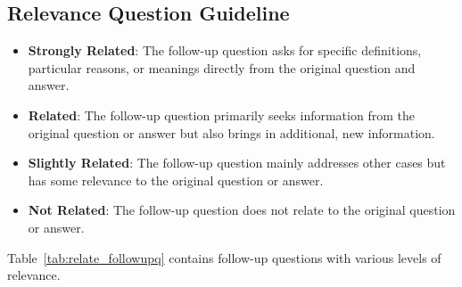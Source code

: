 \subsection{Relevance Question Guideline}

\begin{itemize}
    \item \textbf{Strongly Related}: The follow-up question asks for specific definitions, particular reasons, or meanings directly from the original question and answer.
    \item \textbf{Related}: The follow-up question primarily seeks information from the original question or answer but also brings in additional, new information.
    \item \textbf{Slightly Related}: The follow-up question mainly addresses other cases but has some relevance to the original question or answer.
    \item \textbf{Not Related}: The follow-up question does not relate to the original question or answer.
\end{itemize}
Table~\ref{tab:relate_followupq} contains follow-up questions with various levels of relevance.

